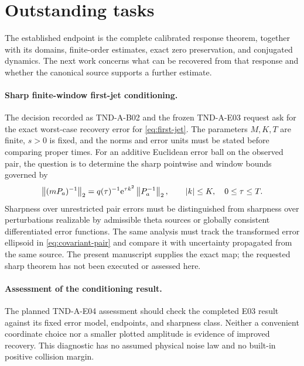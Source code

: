 \section{Outstanding tasks}
\label{sec:outstanding}

The established endpoint is the complete calibrated response theorem,
together with its domains, finite-order estimates, exact zero
preservation, and conjugated dynamics. The next work concerns what can
be recovered from that response and whether the canonical source
supports a further estimate.

\paragraph{Sharp finite-window first-jet conditioning.}
The decision recorded as TND-A-B02 \cite{TNDAuxConditioning} and the
frozen TND-A-E03 request \cite{TNDAuxE03Request} ask for the exact
worst-case recovery error for \eqref{eq:first-jet}. The parameters
$M,K,T$ are finite, $s>0$ is fixed, and the norms and error units must
be stated before comparing proper times. For an additive Euclidean
error ball on the observed pair, the question is to determine the
sharp pointwise and window bounds governed by
\begin{equation}
 \left\lVert(mP_a)^{-1}\right\rVert_2
 =q(\tau)^{-1}\mathrm e^{\tau k^2}\left\lVert P_a^{-1}\right\rVert_2,
 \qquad |k|\le K,\quad 0\le\tau\le T.
 \label{eq:pending-conditioning}
\end{equation}
Sharpness over unrestricted pair errors must be distinguished from
sharpness over perturbations realizable by admissible theta sources
or globally consistent differentiated error functions. The same
analysis must track the transformed error ellipsoid in
\eqref{eq:covariant-pair} and compare it with uncertainty propagated
from the same source. The present manuscript supplies the exact map;
the requested sharp theorem has not been executed or assessed here.

\paragraph{Assessment of the conditioning result.}
The planned TND-A-E04 assessment should check the completed E03 result
against its fixed error model, endpoints, and sharpness class. Neither
a convenient coordinate choice nor a smaller plotted amplitude is
evidence of improved recovery. This diagnostic has no assumed
physical noise law and no built-in positive collision margin.

